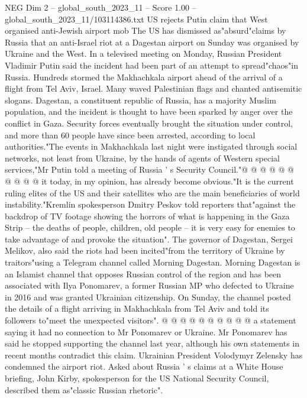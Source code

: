 \begin{textsample}{NEG Dim 2 – global\_south\_2023\_11 – Score 1.00 – global\_south\_2023\_11/103114386.txt}  \label{ex:f2_neg_225}
US rejects Putin claim that West organised anti-Jewish airport mob The US has dismissed as"absurd"claims by Russia that an anti-Israel riot at a Dagestan airport on Sunday was organised by Ukraine and the West.
In a televised meeting on Monday, Russian President Vladimir Putin said the incident had been part of an attempt to spread"chaos"in Russia.
Hundreds stormed the Makhachkala airport ahead of the arrival of a flight from Tel Aviv, Israel.
Many waved Palestinian flags and chanted antisemitic slogans.
Dagestan, a constituent republic of Russia, has a majority Muslim population, and the incident is thought to have been sparked by anger over the conflict in Gaza.
Security forces eventually brought the situation under control, and more than 60 people have since been arrested, according to local authorities."The events in Makhachkala last night were instigated through social networks, not least from Ukraine, by the hands of agents of Western special services,"Mr Putin told a meeting of Russia ' s Security Council."@ @ @ @ @ @ @ @ @ @ it today, in my opinion, has already become obvious."It is the current ruling elites of the US and their satellites who are the main beneficiaries of world instability."Kremlin spokesperson Dmitry Peskov told reporters that"against the backdrop of TV footage showing the horrors of what is happening in the Gaza Strip -- the deaths of people, children, old people -- it is very easy for enemies to take advantage of and provoke the situation".
The governor of Dagestan, Sergei Melikov, also said the riots had been incited"from the territory of Ukraine by traitors"using a Telegram channel called Morning Dagestan.
Morning Dagestan is an Islamist channel that opposes Russian control of the region and has been associated with Ilya Ponomarev, a former Russian MP who defected to Ukraine in 2016 and was granted Ukrainian citizenship.
On Sunday, the channel posted the details of a flight arriving in Makhachkala from Tel Aviv and told its followers to"meet the unexpected visitors". @ @ @ @ @ @ @ @ @ @ a statement saying it had no connection to Mr Ponomarev or Ukraine.
Mr Ponomarev has said he stopped supporting the channel last year, although his own statements in recent months contradict this claim.
Ukrainian President Volodymyr Zelensky has condemned the airport riot.
Asked about Russia ' s claims at a White House briefing, John Kirby, spokesperson for the US National Security Council, described them as"classic Russian rhetoric".

\end{textsample}
